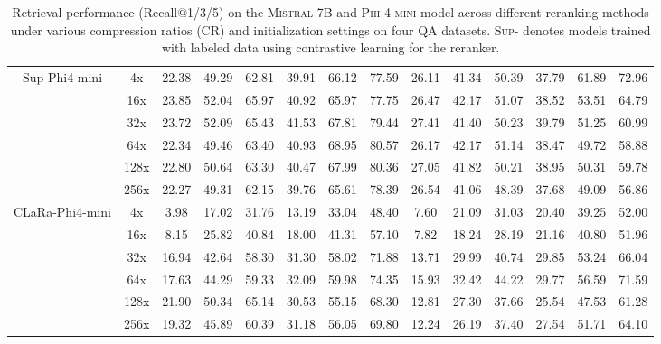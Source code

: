 \documentclass{applemlr}
\numberwithin{equation}{section}
\begin{document}
\begin{table}[!htbp]
\begin{tabular}{c|c|ccc|ccc|ccc|ccc}
\multirow{6}{*}{Sup-Phi4-mini} & 4x & 22.38 & 49.29 & 62.81 & 39.91 & 66.12 & 77.59 & 26.11 & 41.34 & 50.39 & 37.79 & 61.89 & 72.96 \\
 & 16x & 23.85 & 52.04 & 65.97 & 40.92 & 65.97 & 77.75 & 26.47 & 42.17 & 51.07 & 38.52 & 53.51 & 64.79 \\
 & 32x & 23.72 & 52.09 & 65.43 & 41.53 & 67.81 & 79.44 & 27.41 & 41.40 & 50.23 & 39.79 & 51.25 & 60.99 \\
 & 64x & 22.34 & 49.46 & 63.40 & 40.93 & 68.95 & 80.57 & 26.17 & 42.17 & 51.14 & 38.47 & 49.72 & 58.88 \\
 & 128x & 22.80 & 50.64 & 63.30 & 40.47 & 67.99 & 80.36 & 27.05 & 41.82 & 50.21 & 38.95 & 50.31 & 59.78 \\
 & 256x & 22.27 & 49.31 & 62.15 & 39.76 & 65.61 & 78.39 & 26.54 & 41.06 & 48.39 & 37.68 & 49.09 & 56.86 \\
\cline{2-14}
\multirow{6}{*}{CLaRa-Phi4-mini} & 4x & 3.98 & 17.02 & 31.76 & 13.19 & 33.04 & 48.40 & 7.60 & 21.09 & 31.03 & 20.40 & 39.25 & 52.00  \\
 & 16x & 8.15 & 25.82 & 40.84 & 18.00 & 41.31 & 57.10 & 7.82 & 18.24 & 28.19 & 21.16 & 40.80 & 51.96  \\
 & 32x & 16.94 & 42.64 & 58.30 & 31.30 & 58.02 & 71.88 & 13.71 & 29.99 & 40.74 & 29.85 & 53.24 & 66.04  \\
 & 64x & 17.63 & 44.29 & 59.33 & 32.09 & 59.98 & 74.35 & 15.93 & 32.42 & 44.22 & 29.77 & 56.59 & 71.59  \\
 & 128x & 21.90 & 50.34 & 65.14 & 30.53 & 55.15 & 68.30 & 12.81 & 27.30 & 37.66 & 25.54 & 47.53 & 61.28 \\
 & 256x & 19.32 & 45.89 & 60.39 & 31.18 & 56.05 & 69.80 & 12.24 & 26.19 & 37.40 & 27.54 & 51.71 & 64.10 \\

\hline
\end{tabular}
\caption{
Retrieval performance (Recall@1/3/5) on the \textsc{Mistral-7B}  and \textsc{Phi-4-mini} model across different reranking methods under various compression ratios (CR) and initialization settings on four QA datasets. 
\textsc{Sup-} denotes models trained with labeled data using contrastive learning for the reranker.
}
\label{app:retrieval_results_mistral}
\end{table}
\end{document}
